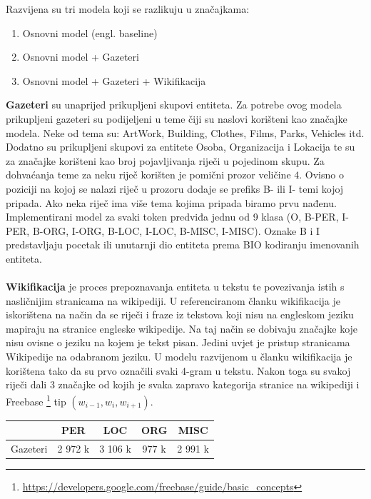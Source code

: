 \documentclass[times, utf8, seminar]{fer}
\begin{document}
Razvijena su tri modela koji se razlikuju u značajkama:
\begin{enumerate}
\item Osnovni model (engl. baseline) 
\item Osnovni model + Gazeteri
\item Osnovni model + Gazeteri + Wikifikacija
\end{enumerate}
\textbf{Gazeteri} su unaprijed prikupljeni skupovi entiteta. Za potrebe ovog modela prikupljeni gazeteri su podijeljeni u teme čiji su naslovi korišteni kao značajke modela. Neke od tema su: ArtWork, Building, Clothes, Films, Parks, Vehicles itd. Dodatno su prikupljeni skupovi za entitete Osoba, Organizacija i Lokacija te su za značajke korišteni kao broj pojavljivanja riječi u pojedinom skupu. Za dohvaćanja teme za neku riječ korišten je pomični prozor veličine $ 4 $. Ovisno o poziciji na kojoj se nalazi riječ u prozoru dodaje se prefiks B- ili I- temi kojoj pripada. Ako neka riječ ima više tema kojima pripada biramo prvu nađenu.\citep{DBLP:conf/conll/TsaiMR16} \\
Implementirani model za svaki token predviđa jednu od 9 klasa (O, B-PER, I-PER, B-ORG, I-ORG, B-LOC, I-LOC, B-MISC, I-MISC). Oznake B i I predstavljaju pocetak ili unutarnji dio entiteta prema BIO kodiranju imenovanih entiteta.\\\\
\textbf{Wikifikacija} je proces prepoznavanja entiteta u tekstu te povezivanja istih s nasličnijim stranicama na wikipediji. U referenciranom članku wikifikacija je iskorištena na način da se riječi i fraze iz tekstova koji nisu na engleskom jeziku mapiraju na stranice engleske wikipedije. Na taj način se dobivaju značajke koje nisu ovisne o jeziku na kojem je tekst pisan. Jedini uvjet je pristup stranicama Wikipedije na odabranom jeziku. U modelu razvijenom u članku wikifikacija je korištena tako da su prvo označili svaki 4-gram u tekstu. Nakon toga su svakoj riječi dali 3 značajke od kojih je svaka zapravo kategorija stranice na wikipediji i Freebase \footnote{\url{https://developers.google.com/freebase/guide/basic_concepts}} tip $ (w_{i-1}, w_{i}, w_{i+1}) $. \citep{DBLP:conf/conll/TsaiMR16}
\begin{center}
\begin{tabular}{ lcccc }
\hline
 & PER & LOC & ORG & MISC\\ 
\hline
Gazeteri & 2 972 k & 3 106 k & 977 k & 2 991 k \\
\hline
\end{tabular}
\end{center}
\end{document}
